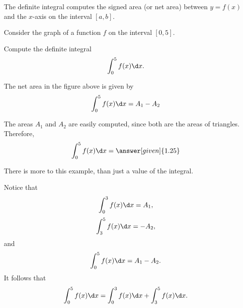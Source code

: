 \documentclass{ximera}
\begin{document}
The definite integral computes the signed area (or net area) between $y=f(x)$ and the $x$-axis on the
interval $[a,b]$.
\begin{question}
Consider the graph of  a function $f$ on the interval $[0,5]$.
\begin{image}
\end{image}
Compute the definite integral
\[
\int_0^5 f(x) \d x.
\]
\begin{explanation}
The net area in the figure above is given by
\[
\int_0^5 f(x) \d x=A_1-A_2
\]
 
The areas $A_1$ and $A_2$ are easily computed, since both are the  areas of triangles. Therefore,
\[
\int_0^5 f(x) \d x=\answer[given]{1.25}
\]
\end{explanation}
\end{question}
There is more to this example, than just a value of the integral.


Notice that 
\[
 \int_0^3 f(x) \d x= A_1,
 \]
 \[
 \int_3^5 f(x) \d x=-A_2,
 \]
and
\[
\int_0^5 f(x) \d x=A_1-A_2.
\]
It follows that
 \[
\int_0^5 f(x) \d x= \int_0^3 f(x) \d x+ \int_3^5 f(x) \d x.
\]
\end{document}
